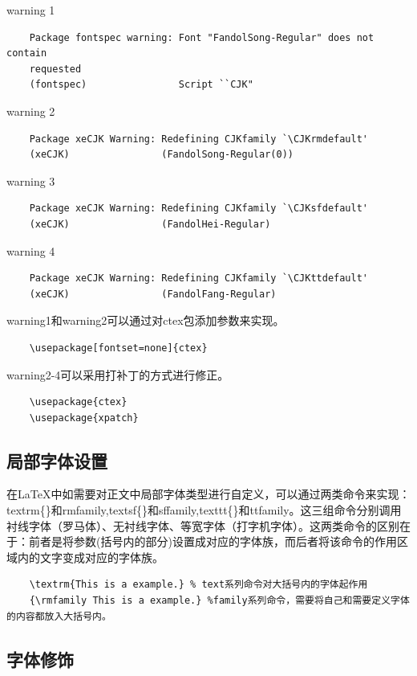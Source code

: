 \documentclass[12pt]{book}
\begin{document}
warning 1
\begin{verbatim}
	Package fontspec warning: Font "FandolSong-Regular" does not contain
	requested 
	(fontspec)                Script ``CJK"
\end{verbatim}

warning 2
\begin{verbatim}
	Package xeCJK Warning: Redefining CJKfamily `\CJKrmdefault'
	(xeCJK)                (FandolSong-Regular(0))
\end{verbatim}

warning 3
\begin{verbatim}
	Package xeCJK Warning: Redefining CJKfamily `\CJKsfdefault'
	(xeCJK)                (FandolHei-Regular)
\end{verbatim}

warning 4
\begin{verbatim}
	Package xeCJK Warning: Redefining CJKfamily `\CJKttdefault'
	(xeCJK)                (FandolFang-Regular)
\end{verbatim}

warning1和warning2可以通过对ctex包添加参数来实现。
\begin{verbatim}
	\usepackage[fontset=none]{ctex}
\end{verbatim}

warning2-4可以采用打补丁的方式进行修正。
\begin{verbatim}
	\usepackage{ctex}
	\usepackage{xpatch}
\end{verbatim}

\subsection{局部字体设置}

在\LaTeX{}中如需要对正文中局部字体类型进行自定义，可以通过两类命令来实现：textrm\{\}和rmfamily,textsf\{\}和sffamily,texttt\{\}和ttfamily。这三组命令分别调用衬线字体（罗马体）、无衬线字体、等宽字体（打字机字体）。这两类命令的区别在于：前者是将参数(括号内的部分)设置成对应的字体族，而后者将该命令的作用区域内的文字变成对应的字体族。

\begin{verbatim}
	\textrm{This is a example.} % text系列命令对大括号内的字体起作用
	{\rmfamily This is a example.} %family系列命令，需要将自己和需要定义字体的内容都放入大括号内。
\end{verbatim}

\subsection{字体修饰}
\end{document}
